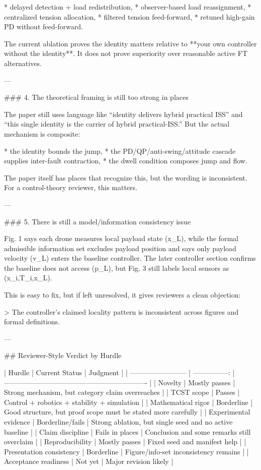 * delayed detection + load redistribution,
* observer-based load reassignment,
* centralized tension allocation,
* filtered tension feed-forward,
* retuned high-gain PD without feed-forward.

The current ablation proves the identity matters relative to **your own controller without the identity**. It does not prove superiority over reasonable active FT alternatives.

---

### 4. The theoretical framing is still too strong in places

The paper still uses language like “identity delivers hybrid practical ISS” and “this single identity is the carrier of hybrid practical-ISS.” But the actual mechanism is composite:

* the identity bounds the jump,
* the PD/QP/anti-swing/attitude cascade supplies inter-fault contraction,
* the dwell condition composes jump and flow.

The paper itself has places that recognize this, but the wording is inconsistent. For a control-theory reviewer, this matters.

---

### 5. There is still a model/information consistency issue

Fig. 1 says each drone measures local payload state (x_L), while the formal admissible information set excludes payload position and says only payload velocity (v_L) enters the baseline controller.  The later controller section confirms the baseline does not access (p_L), but Fig. 3 still labels local sensors as (x_i,T_i,x_L).

This is easy to fix, but if left unresolved, it gives reviewers a clean objection:

> The controller’s claimed locality pattern is inconsistent across figures and formal definitions.

---

## Reviewer-Style Verdict by Hurdle

| Hurdle                   |   Current Status | Judgment                                                      |
| ------------------------ | ---------------: | ------------------------------------------------------------- |
| Novelty                  |    Mostly passes | Strong mechanism, but category claim overreaches              |
| TCST scope               |           Passes | Control + robotics + stability + simulation                   |
| Mathematical rigor       |       Borderline | Good structure, but proof scope must be stated more carefully |
| Experimental evidence    | Borderline/fails | Strong ablation, but single seed and no active baseline       |
| Claim discipline         |  Fails in places | Conclusion and some remarks still overclaim                   |
| Reproducibility          |    Mostly passes | Fixed seed and manifest help                                  |
| Presentation consistency |       Borderline | Figure/info-set inconsistency remains                         |
| Acceptance readiness     |          Not yet | Major revision likely                                         |


